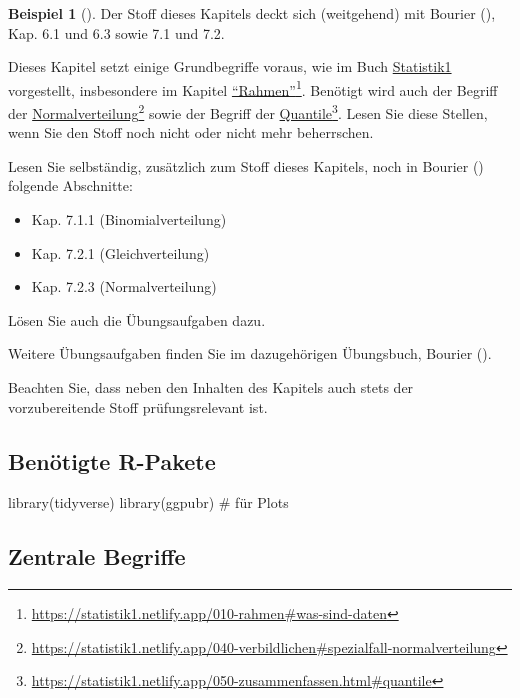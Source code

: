 \documentclass[
  ngerman,
  letterpaper,
  twoside,
  open=any]{scrbook}
\newenvironment{Shaded}{\begin{snugshade}}{\end{snugshade}}
\newcommand{\CommentTok}[1]{\textcolor[rgb]{0.37,0.37,0.37}{#1}}
\newcommand{\FunctionTok}[1]{\textcolor[rgb]{0.28,0.35,0.67}{#1}}
\newcommand{\NormalTok}[1]{\textcolor[rgb]{0.00,0.23,0.31}{#1}}
\providecommand{\tightlist}{%
  \setlength{\itemsep}{0pt}\setlength{\parskip}{0pt}}\usepackage{longtable,booktabs,array}
\theoremstyle{definition}
\newtheorem{example}{Beispiel}[chapter]
\theoremstyle{plain}
\theoremstyle{definition}
\theoremstyle{definition}
\theoremstyle{remark}
\begin{document}
\begin{example}[]
Der Stoff dieses Kapitels deckt sich (weitgehend) mit Bourier
(), Kap. 6.1 und 6.3 sowie 7.1 und 7.2.

Dieses Kapitel setzt einige Grundbegriffe voraus, wie im Buch
\href{}{Statistik1} vorgestellt, insbesondere im Kapitel
\href{https://statistik1.netlify.app/010-rahmen\#was-sind-daten}{\enquote{Rahmen}}\footnote{\url{https://statistik1.netlify.app/010-rahmen\#was-sind-daten}}.
Benötigt wird auch der Begriff der
\href{https://statistik1.netlify.app/040-verbildlichen\#spezialfall-normalverteilung}{Normalverteilung}\footnote{\url{https://statistik1.netlify.app/040-verbildlichen\#spezialfall-normalverteilung}}
sowie der Begriff der
\href{https://statistik1.netlify.app/050-zusammenfassen.html\#quantile}{Quantile}\footnote{\url{https://statistik1.netlify.app/050-zusammenfassen.html\#quantile}}.
Lesen Sie diese Stellen, wenn Sie den Stoff noch nicht oder nicht mehr
beherrschen.

Lesen Sie selbständig, zusätzlich zum Stoff dieses Kapitels, noch in
Bourier () folgende Abschnitte:

\begin{itemize}
\tightlist
\item
  Kap. 7.1.1 (Binomialverteilung)
\item
  Kap. 7.2.1 (Gleichverteilung)
\item
  Kap. 7.2.3 (Normalverteilung)
\end{itemize}

Lösen Sie auch die Übungsaufgaben dazu.

Weitere Übungsaufgaben finden Sie im dazugehörigen Übungsbuch, Bourier
().

Beachten Sie, dass neben den Inhalten des Kapitels auch stets der
vorzubereitende Stoff prüfungsrelevant ist.

\subsection{Benötigte R-Pakete}\label{benuxf6tigte-r-pakete}

\begin{Shaded}
\begin{Highlighting}[]
\FunctionTok{library}\NormalTok{(tidyverse)}
\FunctionTok{library}\NormalTok{(ggpubr)  }\CommentTok{\# für Plots}
\end{Highlighting}
\end{Shaded}

\subsection{Zentrale Begriffe}\label{zentrale-begriffe}


\end{example}
\end{document}
